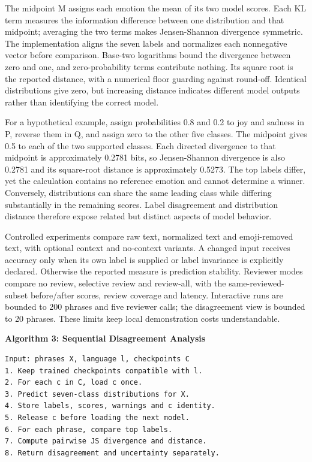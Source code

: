 \documentclass[journal]{IEEEtran}
\begin{document}
The midpoint M assigns each emotion the mean of its two model scores. Each KL term measures the information difference between one distribution and that midpoint; averaging the two terms makes Jensen-Shannon divergence symmetric. The implementation aligns the seven labels and normalizes each nonnegative vector before comparison. Base-two logarithms bound the divergence between zero and one, and zero-probability terms contribute nothing. Its square root is the reported distance, with a numerical floor guarding against round-off. Identical distributions give zero, but increasing distance indicates different model outputs rather than identifying the correct model.

For a hypothetical example, assign probabilities 0.8 and 0.2 to joy and sadness in P, reverse them in Q, and assign zero to the other five classes. The midpoint gives 0.5 to each of the two supported classes. Each directed divergence to that midpoint is approximately 0.2781 bits, so Jensen-Shannon divergence is also 0.2781 and its square-root distance is approximately 0.5273. The top labels differ, yet the calculation contains no reference emotion and cannot determine a winner. Conversely, distributions can share the same leading class while differing substantially in the remaining scores. Label disagreement and distribution distance therefore expose related but distinct aspects of model behavior.

Controlled experiments compare raw text, normalized text and emoji-removed text, with optional context and no-context variants. A changed input receives accuracy only when its own label is supplied or label invariance is explicitly declared. Otherwise the reported measure is prediction stability. Reviewer modes compare no review, selective review and review-all, with the same-reviewed-subset before/after scores, review coverage and latency. Interactive runs are bounded to 200 phrases and five reviewer calls; the disagreement view is bounded to 20 phrases. These limits keep local demonstration costs understandable.

\par\smallskip\noindent\begin{minipage}[t]{\columnwidth}
\textbf{Algorithm 3: Sequential Disagreement Analysis}
\begin{lstlisting}
Input: phrases X, language l, checkpoints C
1. Keep trained checkpoints compatible with l.
2. For each c in C, load c once.
3. Predict seven-class distributions for X.
4. Store labels, scores, warnings and c identity.
5. Release c before loading the next model.
6. For each phrase, compare top labels.
7. Compute pairwise JS divergence and distance.
8. Return disagreement and uncertainty separately.
\end{lstlisting}
\end{minipage}\par\smallskip
\end{document}
